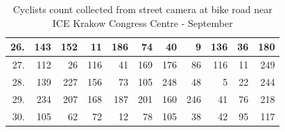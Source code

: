 \begin{table}[H]
{\begin{tabular}{|r|r|r|r|r|r|r|r|r|r|r|}
26.                    & 143                            & 152                             & 11                               & 186                              & 74                               & 40                               & 9                                & 136                              & 36                               & 180                              \\ \hline
27.                    & 112                            & 26                              & 116                              & 41                               & 169                              & 176                              & 86                               & 116                              & 11                               & 249                              \\ \hline
28.                    & 139                            & 227                             & 156                              & 73                               & 105                              & 248                              & 48                               & 5                                & 22                               & 244                              \\ \hline
29.                    & 234                            & 207                             & 168                              & 187                              & 201                              & 160                              & 246                              & 41                               & 76                               & 218                              \\ \hline
30.                    & 105                            & 62                              & 72                               & 12                               & 78                               & 105                              & 38                               & 42                               & 95                               & 117                              \\ \hline
\end{tabular}}
\caption{Cyclists count collected from street camera at bike road near ICE Krakow Congress Centre - September}
\label{tab:iceCountSeptember}
\end{table}
